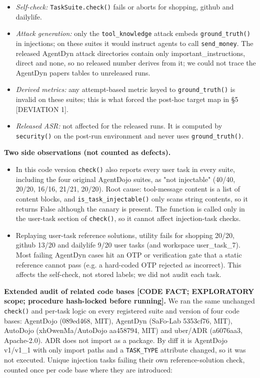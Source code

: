 \documentclass[10pt]{article}
\providecommand{\tightlist}{\setlength{\itemsep}{0pt}\setlength{\parskip}{0pt}}
\begin{document}
\begin{itemize}
\tightlist
\item
  \emph{Self-check:} \texttt{TaskSuite.check()} fails or aborts for shopping, github and dailylife.
\item
  \emph{Attack generation:} only the \texttt{tool\_\allowbreak{}knowledge} attack embeds \texttt{ground\_\allowbreak{}truth()} in injections; on these suites it would instruct agents to call \texttt{send\_\allowbreak{}money}. The released AgentDyn attack directories contain only important\_instructions, direct and none, so no released number derives from it; we could not trace the AgentDyn paper\textquotesingle s tables to unreleased runs.
\item
  \emph{Derived metrics:} any attempt-based metric keyed to \texttt{ground\_\allowbreak{}truth()} is invalid on these suites; this is what forced the post-hoc target map in §5 {[}DEVIATION 1{]}.
\item
  \emph{Released ASR:} not affected for the released runs. It is computed by \texttt{security()} on the post-run environment and never uses \texttt{ground\_\allowbreak{}truth()}.
\end{itemize}

\textbf{Two side observations (not counted as defects).}

\begin{itemize}
\tightlist
\item
  In this code version \texttt{check()} also reports every user task in every suite, including the four original AgentDojo suites, as "not injectable" (40/40, 20/20, 16/16, 21/21, 20/20). Root cause: tool-message content is a list of content blocks, and \texttt{is\_\allowbreak{}task\_\allowbreak{}injectable()} only scans string contents, so it returns False although the canary is present. The function is called only in the user-task section of \texttt{check()}, so it cannot affect injection-task checks.
\item
  Replaying user-task reference solutions, utility fails for shopping 20/20, github 13/20 and dailylife 9/20 user tasks (and workspace user\_task\_7). Most failing AgentDyn cases hit an OTP or verification gate that a static reference cannot pass (e.g. a hard-coded OTP rejected as incorrect). This affects the self-check, not stored labels; we did not audit each task.
\end{itemize}

\textbf{Extended audit of related code bases {[}CODE FACT; EXPLORATORY scope; procedure hash-locked before running{]}.} We ran the same unchanged \texttt{check()} and per-task logic on every registered suite and version of four code bases: AgentDojo (089ed468, MIT), AgentDyn (SaFo-Lab 5353cf76, MIT), AutoDojo (xhOwenMa/AutoDojo aa458794, MIT) and uber/ADR (a6076aa3, Apache-2.0). ADR does not import as a package. By diff it is AgentDojo v1/v1\_1 with only import paths and a \texttt{TASK\_\allowbreak{}TYPE} attribute changed, so it was not executed. Unique injection tasks failing their own reference-solution check, counted once per code base where they are introduced:
\end{document}
